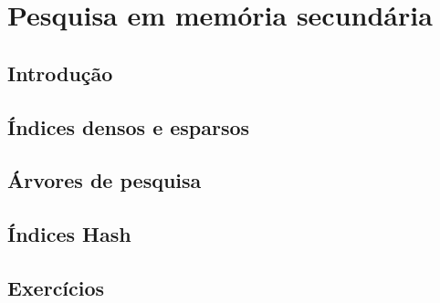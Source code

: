 \chapter{Pesquisa em memória secundária}

\section{Introdução}

\section{Índices densos e esparsos}

\section{Árvores de pesquisa}

\section{Índices Hash}

\section{Exercícios}

